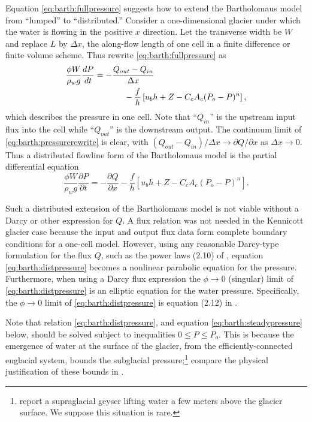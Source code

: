 \documentclass[review,letterpaper]{igs}
\begin{document}
Equation \eqref{eq:barth:fullpressure} suggests how to extend the Bartholomaus model from ``lumped'' to ``distributed.''  Consider a one-dimensional glacier under which the water is flowing in the positive $x$ direction.  Let the transverse width be $W$ and replace $L$ by $\Delta x$, the along-flow length of one cell in a finite difference or finite volume scheme.  Thus rewrite \eqref{eq:barth:fullpressure} as
\begin{align}
&\frac{\phi W}{\rho_w g}\frac{dP}{dt} = - \frac{Q_{out} - Q_{in}}{\Delta x}  \label{eq:barth:pressurerewrite} \\
&\qquad \qquad \qquad \quad - \frac{f}{h} \left[u_b h + Z - C_c A_c (P_o-P)^n\right], \notag
\end{align}
which describes the pressure in one cell.  Note that ``$Q_{in}$'' is the upstream input flux into the cell while ``$Q_{out}$'' is the downstream output.  The continuum limit of \eqref{eq:barth:pressurerewrite} is clear, with $(Q_{out} - Q_{in})/\Delta x \to \partial Q/\partial x$ as $\Delta x \to 0$.  Thus a distributed flowline form of the Bartholomaus model is the partial differential equation
\begin{equation}
\frac{\phi W}{\rho_w g} \frac{\partial P}{\partial t} = - \frac{\partial Q}{\partial x} - \frac{f}{h} \left[u_b h + Z - C_c A_c (P_o-P)^n\right]. \label{eq:barth:distpressure}
\end{equation}

Such a distributed extension of the Bartholomaus model is not viable without a Darcy or other expression for $Q$.  A flux relation was not needed in the Kennicott glacier case because the input and output flux data form complete boundary conditions for a one-cell model.  However, using any reasonable Darcy-type formulation for the flux $Q$, such as the power laws (2.10) of \cite{Schoofetal2012}, equation \eqref{eq:barth:distpressure} becomes a nonlinear parabolic equation for the pressure.  Furthermore, when using a Darcy flux expression the $\phi\to 0$ (singular) limit of \eqref{eq:barth:distpressure} is an elliptic equation for the water pressure.  Specifically, the $\phi\to 0$ limit of \eqref{eq:barth:distpressure} is equation (2.12) in \cite{Schoofetal2012}.

Note that relation \eqref{eq:barth:distpressure}, and equation \eqref{eq:barth:steadypressure} below, should be solved subject to inequalities $0 \le P \le P_o$.  This is because the emergence of water at the surface of the glacier, from the efficiently-connected englacial system, bounds the subglacial pressure;\footnote{\cite{Bartholomausetal2011} report a supraglacial geyser lifting water a few meters above the glacier surface.  We suppose this situation is rare.} compare the physical justification of these bounds in \cite{Schoofetal2012}.
\end{document}
